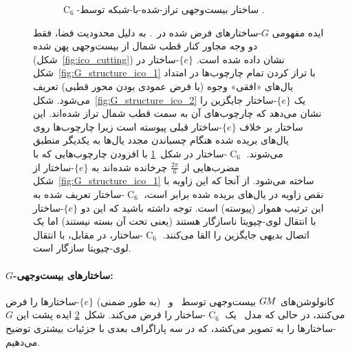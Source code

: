 \begin{figure}
\begin{subfigure}[b]{0.31\textwidth}
		\vspace*{-6pt}
		\captionsetup{width=.9\textwidth}
		\caption{\small
			$\operatorname{C}_6$-ساختار بیست‌وجهی تراز-شده-با-شبکه توسط \citet{gaugeIco2019}.
		}
		\label{fig:G_structure_ico_3}
	\end{subfigure}
	\caption{\small
		ایده مفهومی $G$-ساختارهای فرض شده در~\cite{liu2018icoAltAz,zhang2019orientation,gaugeIco2019}.
		به دلیل محدودیت فضا، فقط دو وجه مجاور کنار قطب شمال از بیست‌وجهی پهن شده (شکل~\ref{fig:ico_cutting}) نشان داده شده است.
		$\{e\}$-ساختار در شکل~\ref{fig:G_structure_ico_1} با تراز کردن تمام چارچوب‌ها در امتداد یال‌های «افقی» وجوه (با فرض عمودی بودن محور قطبی) تعریف می‌شود.
		شکل~\ref{fig:G_structure_ico_2} یک $\{e\}$-ساختار جایگزین را نشان می‌دهد که چارچوب‌های آن به سمت قطب شمال تراز شده‌اند.
		این ساختار بر خلاف $\{e\}$-ساختار قبلی پیوسته است زیرا چارچوب‌ها روی یال‌های بریده شده هنگام چسباندن مجدد یال‌ها به یکدیگر منطبق می‌شوند.
		$\operatorname{C}_6$-ساختار در شکل~\ref{fig:G_structure_ico_3} با افزودن چارچوب‌هایی که با مضرب‌هایی از $\frac{2\pi}{6}$ چرخانده شده‌اند به $\{e\}$-ساختار از شکل~\ref{fig:G_structure_ico_1} ساخته می‌شود.
		از آنجا که این زاویه با نقص زاویه در یال‌های بریده شده برابر است، $\operatorname{C}_6$-ساختار تعریف شده به این ترتیب هموار (پیوسته) است.
		توجه داشته باشید که این دو $\{e\}$-ساختار با انتقال لوی-چیویتا ناسازگار هستند (یعنی تحت آن بسته نیستند) اما یک اتصال بدیهی جایگزین را القا می‌کنند.
		$\operatorname{C}_6$-ساختار، در مقابل، با انتقال لوی-چیویتا سازگار است.
	}
	\label{fig:G_structures_ico}
\end{figure}


\paragraph{$G$-ساختارهای بیست‌وجهی:}
کانولوشن‌های $G\mkern-1.4muM$ بیست‌وجهی توسط~\citet{liu2018icoAltAz} و~\citet{zhang2019orientation} (به طور ضمنی) $\{e\}$-ساختارها را فرض می‌کنند، در حالی که مدل~\citet{gaugeIco2019} یک $\operatorname{C}_6$-ساختار را فرض می‌کند.
شکل~\ref{fig:G_structures_ico} ایده پشت این $G$-ساختارها را به تصویر می‌کشد، که در سه پاراگراف بعدی با جزئیات بیشتری توضیح می‌دهیم.



